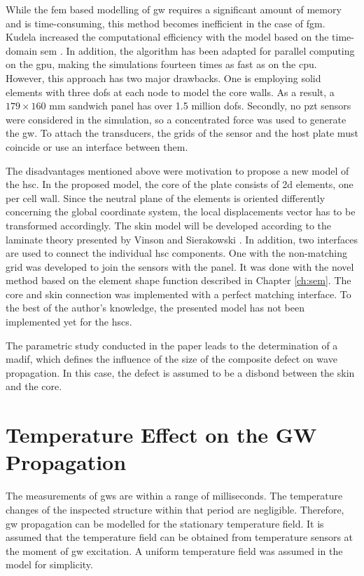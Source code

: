\documentclass[11pt,a4paper,final]{report}
\begin{document}
While the \ac{fem} based modelling of \ac{gw} requires a significant amount of memory and is time-consuming, this method becomes inefficient in the case of \ac{fgm}.
Kudela increased the computational efficiency with the model based on the time-domain \ac{sem} \cite{kudela2016parallel}.
In addition, the algorithm has been adapted for parallel computing on the \ac{gpu}, making the simulations fourteen times as fast as on the \ac{cpu}.
However, this approach has two major drawbacks. One is employing solid elements with three \acp{dof} at each node to model the core walls. As a result, a $179\times160$ mm sandwich panel has over 1.5 million \acp{dof}.
Secondly, no \ac{pzt} sensors were considered in the simulation, so a concentrated force was used to generate the \ac{gw}.
To attach the transducers, the grids of the sensor and the host plate must coincide or use an interface between them. 

The disadvantages mentioned above were motivation to propose a new model of the \ac{hsc}.
In the proposed model, the core of the plate consists of \ac{2d} elements, one per cell wall.
Since the neutral plane of the elements is oriented differently concerning the global coordinate system, the local displacements vector has to be transformed accordingly.
The skin model will be developed according to the laminate theory presented by Vinson and Sierakowski \cite{vinson1993behavior}.
In addition, two interfaces are used to connect the individual \ac{hsc} components.
One with the non-matching grid was developed to join the sensors with the panel.
It was done with the novel method based on the element shape function described in Chapter \ref{ch:sem}.
The core and skin connection was implemented with a perfect matching interface.
To the best of the author's knowledge, the presented model has not been implemented yet for the \acp{hsc}.

The parametric study conducted in the paper leads to the determination of a \ac{madif}, which defines the influence of the size of the composite defect on wave propagation.
In this case, the defect is assumed to be a disbond between the skin and the core. \section{Temperature Effect on the GW Propagation}
\label{sec:temp}



The measurements of \acp{gw} are within a range of milliseconds.
The temperature changes of the inspected structure within that period are negligible.
Therefore, \ac{gw} propagation can be modelled for the stationary temperature field.
It is assumed that the temperature field can be obtained from temperature sensors at the moment of \ac{gw} excitation.
A uniform temperature field was assumed in the model for simplicity.
\end{document}
